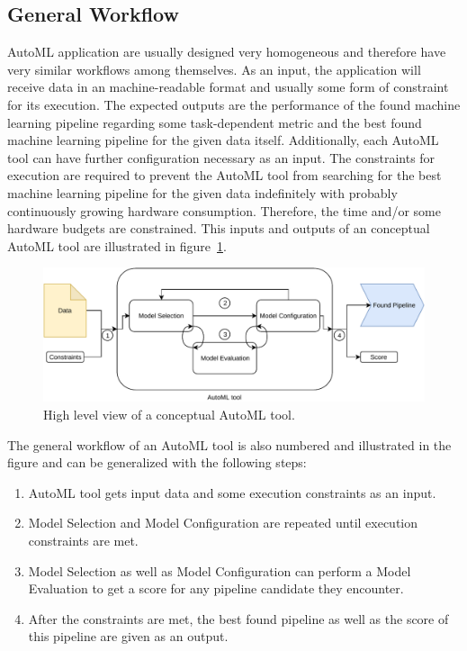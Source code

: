 \subsection{General Workflow}
\label{sec:theory:automl:workflow}
AutoML application are usually designed very homogeneous and therefore have very similar workflows among themselves.
As an input, the application will receive data in an machine-readable format and usually some form of constraint for its execution.
The expected outputs are the performance of the found machine learning pipeline regarding some task-dependent metric and the best found machine learning pipeline for the given data itself.
Additionally, each AutoML tool can have further configuration necessary as an input.\newline
The constraints for execution are required to prevent the AutoML tool from searching for the best machine learning pipeline for the given data indefinitely with probably continuously growing hardware consumption.
Therefore, the time and/or some hardware budgets are constrained.
This inputs and outputs of an conceptual AutoML tool are illustrated in figure~\ref{fig:theory:conceptualAutoMLTool}.\newline
\begin{figure}[ht!]
    \centering
    \includegraphics[width=\textwidth]{gfx/Figures/AutoMLTool.pdf}
    \caption{High level view of a conceptual AutoML tool. }
	\label{fig:theory:conceptualAutoMLTool}
\end{figure}
The general workflow of an AutoML tool is also numbered and illustrated in the figure and can be generalized with the following steps:
\begin{enumerate}
    \item AutoML tool gets input data and some execution constraints as an input.
    \item Model Selection and Model Configuration are repeated until execution constraints are met.
    \item Model Selection as well as Model Configuration can perform a Model Evaluation to get a score for any pipeline candidate they encounter.
    \item After the constraints are met, the best found pipeline as well as the score of this pipeline are given as an output.
\end{enumerate}
